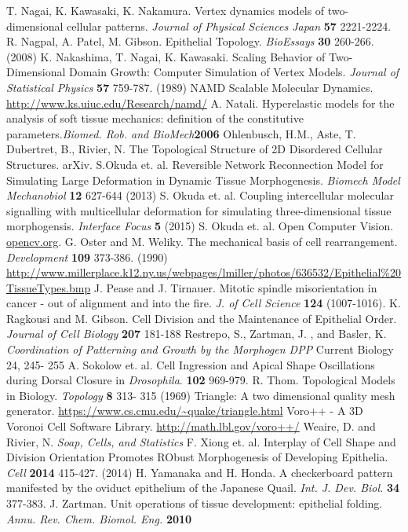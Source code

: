 \begin{thebibliography}{1}
 T. Nagai, K. Kawasaki, K. Nakamura. Vertex dynamics models of two-dimensional cellular patterns. \emph{Journal of Physical Sciences Japan} \textbf{57} 2221-2224.
 R. Nagpal, A. Patel, M. Gibson. Epithelial Topology. \emph{BioEssays} \textbf{30} 260-266. (2008)
 K. Nakashima, T. Nagai, K. Kawasaki. Scaling Behavior of Two-Dimensional  Domain Growth: Computer Simulation of Vertex Models. \emph{Journal of Statistical Physics} \textbf{57} 759-787. (1989)
 NAMD Scalable Molecular Dynamics. \url{http://www.ks.uiuc.edu/Research/namd/}
 A. Natali. Hyperelastic models for the analysis of soft tissue mechanics: definition of the constitutive parameters.\emph{Biomed. Rob. and BioMech}\textbf{2006}
 Ohlenbusch, H.M., Aste, T. Dubertret, B., Rivier, N. The Topological Structure of 2D Disordered Cellular Structures. arXiv.
 S.Okuda et. al. Reversible Network Reconnection Model for Simulating Large Deformation in Dynamic Tissue Morphogenesis. \emph{Biomech Model Mechanobiol} \textbf{12} 627-644 (2013)
 S. Okuda et. al. Coupling intercellular molecular signalling with multicellular deformation for simulating three-dimensional tissue morphogensis. \emph{Interface Focus} \textbf{5} (2015)
S. Okuda et. al.
 Open Computer Vision. \url{opencv.org}.
G. Oster and M. Weliky. The mechanical basis of cell rearrangement. \emph{Development} \textbf{109} 373-386. (1990)
 \url{http://www.millerplace.k12.ny.us/webpages/lmiller/photos/636532/Epithelial\%20TissueTypes.bmp}
 J. Pease and J. Tirnauer. Mitotic spindle misorientation in cancer - out of alignment and into the fire. \emph{J. of Cell Science} \textbf{124} (1007-1016).
 K. Ragkousi and M. Gibson. Cell Division and the Maintenance of Epithelial Order. \emph{Journal of Cell Biology} \textbf{207} 181-188
 Restrepo, S., Zartman, J. , and Basler, K. \emph{ Coordination of Patterning and Growth by the Morphogen DPP} Current Biology 24, 245- 255
 A. Sokolow et. al. Cell Ingression and Apical Shape Oscillations during Dorsal Closure in \emph{Drosophila}. \textbf{102} 969-979.
 R. Thom. Topological Models in Biology. \emph{Topology} \textbf{8} 313- 315 (1969)
 Triangle: A two dimensional quality mesh generator. \url{https://www.cs.cmu.edu/~quake/triangle.html}
 Voro++ - A 3D Voronoi Cell Software Library. \url{http://math.lbl.gov/voro++/}
 Weaire, D. and Rivier, N. \emph{Soap, Cells, and Statistics}
 F. Xiong et. al. Interplay of Cell Shape and Division Orientation Promotes RObust Morphogenesis of Developing Epithelia. \emph{Cell} \textbf{2014} 415-427. (2014)
 H. Yamanaka and H. Honda. A checkerboard pattern manifested by the oviduct epithelium of the Japanese Quail. \emph{Int. J. Dev. Biol.} \textbf{34} 377-383.
 J. Zartman. Unit operations of tissue development: epithelial folding. \emph{Annu. Rev. Chem. Biomol. Eng. }\textbf{2010}
\end{thebibliography}



